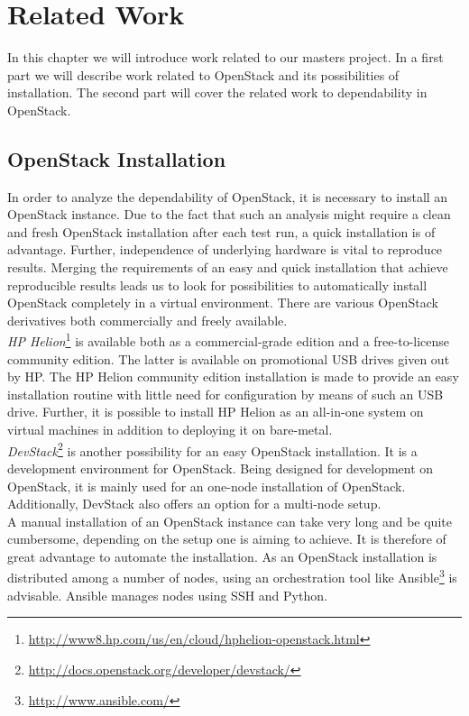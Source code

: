 \section[Related Work \texorpdfstring{{\textbf{\tiny \enspace (JE, SK, NK)}}}{}]{Related Work}
\label{related}
In this chapter we will introduce work related to our masters project. In a first part we will describe work related to OpenStack and its possibilities of installation. The second part will cover the related work to dependability in OpenStack.

\subsection{OpenStack Installation}
In order to analyze the dependability of OpenStack, it is necessary to install an OpenStack instance. Due to the fact that such an analysis might require a clean and fresh OpenStack installation after each test run, a quick installation is of advantage. Further, independence of underlying hardware is vital to reproduce results. Merging the requirements of an easy and quick installation that achieve reproducible results leads us to look for possibilities to automatically install OpenStack completely in a virtual environment. There are various OpenStack derivatives both commercially and freely available.\\

\emph{HP Helion}\footnote{\url{http://www8.hp.com/us/en/cloud/hphelion-openstack.html}} is available both as a commercial-grade edition and a free-to-license community edition. The latter is available on promotional USB drives given out by HP. The HP Helion community edition installation is made to provide an easy installation routine with little need for configuration by means of such an USB drive. Further, it is possible to install HP Helion as an all-in-one system on virtual machines in addition to deploying it on bare-metal. \\

\emph{DevStack}\footnote{\url{http://docs.openstack.org/developer/devstack/}} is another possibility for an easy OpenStack installation. It is a development environment for OpenStack. Being designed for development on OpenStack, it is mainly used for an one-node installation of OpenStack. Additionally, DevStack also offers an option for a multi-node setup.\\

A manual installation of an OpenStack instance can take very long and be quite cumbersome, depending on the setup one is aiming to achieve. It is therefore of great advantage to automate the installation. As an OpenStack installation is distributed among a number of nodes, using an orchestration tool like Ansible\footnote{\url{http://www.ansible.com/}} is advisable. Ansible manages nodes using SSH and Python. \\

